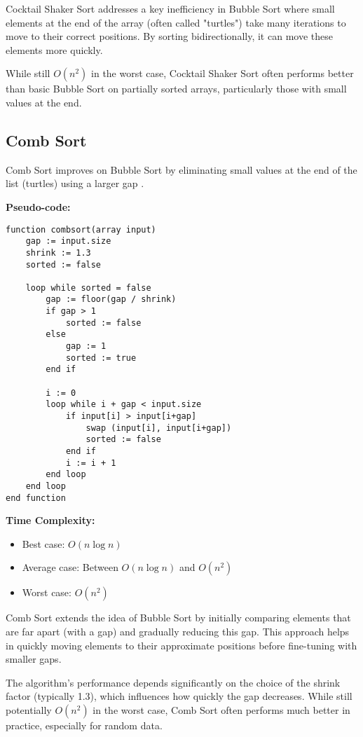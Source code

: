 \documentclass[sigconf]{acmart}
\begin{document}
Cocktail Shaker Sort addresses a key inefficiency in Bubble Sort where small elements at the end of the array (often called "turtles") take many iterations to move to their correct positions. By sorting bidirectionally, it can move these elements more quickly.

While still $O(n^2)$ in the worst case, Cocktail Shaker Sort often performs better than basic Bubble Sort on partially sorted arrays, particularly those with small values at the end.

\subsection{Comb Sort}
Comb Sort improves on Bubble Sort by eliminating small values at the end of the list (turtles) using a larger gap \cite{combsort, dobosiewicz1980efficient}.

\textbf{Pseudo-code:}
\begin{verbatim}
function combsort(array input)
    gap := input.size
    shrink := 1.3
    sorted := false
    
    loop while sorted = false
        gap := floor(gap / shrink)
        if gap > 1
            sorted := false
        else
            gap := 1
            sorted := true
        end if
        
        i := 0
        loop while i + gap < input.size
            if input[i] > input[i+gap]
                swap (input[i], input[i+gap])
                sorted := false
            end if
            i := i + 1
        end loop
    end loop
end function
\end{verbatim}

\textbf{Time Complexity:}
\begin{itemize}
    \item Best case: $O(n \log n)$
    \item Average case: Between $O(n \log n)$ and $O(n^2)$
    \item Worst case: $O(n^2)$
\end{itemize}

Comb Sort extends the idea of Bubble Sort by initially comparing elements that are far apart (with a gap) and gradually reducing this gap. This approach helps in quickly moving elements to their approximate positions before fine-tuning with smaller gaps.

The algorithm's performance depends significantly on the choice of the shrink factor (typically 1.3), which influences how quickly the gap decreases. While still potentially $O(n^2)$ in the worst case, Comb Sort often performs much better in practice, especially for random data.
\end{document}
